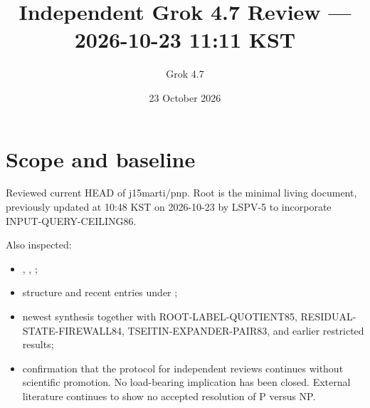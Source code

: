 \documentclass[11pt]{article}
\title{Independent Grok 4.7 Review --- 2026-10-23 11:11 KST}
\author{Grok 4.7}
\date{23 October 2026}
\begin{document}
\maketitle

\begin{center}
\end{center}

\section{Scope and baseline}
Reviewed current HEAD of j15marti/pnp. Root  is the minimal living document, previously updated at 10:48 KST on 2026-10-23 by LSPV-5 to incorporate INPUT-QUERY-CEILING86.

Also inspected:
\begin{itemize}
\item {}, , ;
\item structure and recent entries under ;
\item newest synthesis  together with ROOT-LABEL-QUOTIENT85, RESIDUAL-STATE-FIREWALL84, TSEITIN-EXPANDER-PAIR83, and earlier restricted results;
\item confirmation that the protocol for independent reviews continues without scientific promotion. No load-bearing implication has been closed. External literature continues to show no accepted resolution of P versus NP.
\end{itemize}
\end{document}
